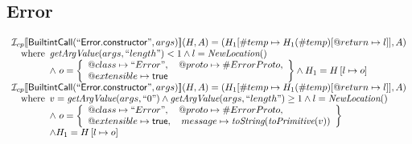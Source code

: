 \subsection{Error}
\[
\begin{array}{l}
\mathcal{I} _{cp}\llbracket \mbox{\textsf{BuiltintCall}}(``\mbox{\textsf{Error.constructor}}",args)\rrbracket(H,A)
  = (H_1[\#temp \mapsto H_1(\#temp)[@return \mapsto l]], A)\\
\quad{\rm where}\begin{array}[t]{l}
  \emph{getArgValue}(args, ``length") < 1 
  \land l=\emph{NewLocation}()\\
  \land\ o = \left\{\begin{array}{l}
    @class\mapsto ``Error", \quad
    @proto\mapsto \#ErrorProto,\\
    @extensible\mapsto \mbox{\textsf{true}}
    \end{array}\right\}
  \land H_1=H\left[l\mapsto o\right]\\
  \end{array}\\
  
\mathcal{I} _{cp}\llbracket \mbox{\textsf{BuiltintCall}}(``\mbox{\textsf{Error.constructor}}",args)\rrbracket(H,A)
  = (H_1[\#temp \mapsto H_1(\#temp)[@return \mapsto l]], A)\\
\quad{\rm where}\begin{array}[t]{l}
  v = \emph{getArgValue}(args, ``0") \land \emph{getArgValue}(args, ``length") \geq 1
  \land l=\emph{NewLocation}()\\
  \land\ o = \left\{\begin{array}{l}
    @class\mapsto ``Error", \quad
    @proto\mapsto \#ErrorProto,\\
    @extensible\mapsto \mbox{\textsf{true}},  \quad
    message \mapsto \emph{toString}(\emph{toPrimitive}(v)) 
    \end{array}\right\}\\
  \land H_1=H\left[l\mapsto o\right]
  \end{array}\\

\end{array}
\]


